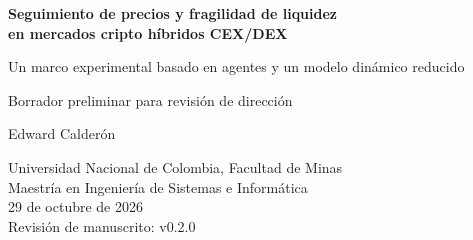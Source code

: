 \documentclass[10pt,a4paper]{article}
\newcommand{\revisionManuscrito}{v0.2.0}
\begin{document}
\begin{center}
  {\LARGE\bfseries Seguimiento de precios y fragilidad de liquidez\\
  en mercados cripto híbridos CEX/DEX\par}
  \vspace{0.35em}
  {\large Un marco experimental basado en agentes y un modelo dinámico reducido\par}
  \vspace{0.35em}
  {\normalsize Borrador preliminar para revisión de dirección\par}
  \vspace{0.8em}
  {\large Edward Calderón\par}
  Universidad Nacional de Colombia, Facultad de Minas\\
  Maestría en Ingeniería de Sistemas e Informática\\
  29 de octubre de 2026\\
  {\small Revisión de manuscrito: \revisionManuscrito}
\end{center}







\appendix


\clearpage
\renewcommand{\refname}{Referencias}


\end{document}
